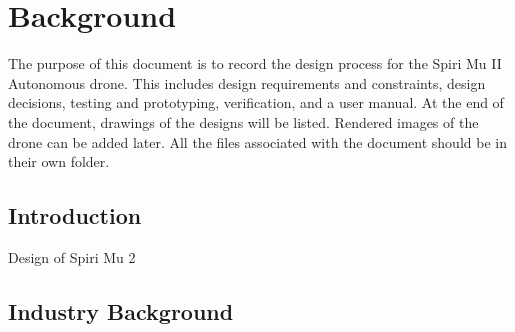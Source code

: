 \chapter{Background}
The purpose of this document is to record the design process for the Spiri Mu II Autonomous drone. This includes design requirements and constraints, design decisions, testing and prototyping, verification, and a user manual.
At the end of the document, drawings of the designs will be listed. Rendered images of the drone can be added later.
All the files associated with the document should be in their own folder.
\section{Introduction}
Design of Spiri Mu 2
\section{Industry Background}

